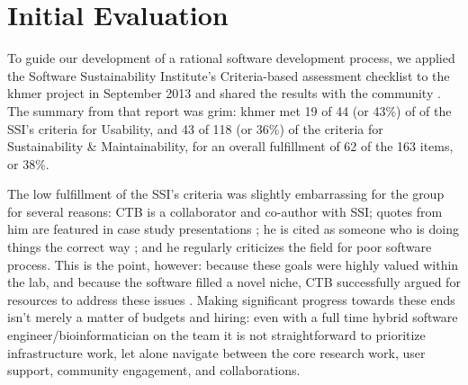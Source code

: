 \documentclass[12pt]{article}
\begin{document}

\section{Initial Evaluation}

To guide our development of a rational software development process,
we applied the Software Sustainability Institute's Criteria-based
assessment checklist \cite{SSI-eval-guide} to the khmer project in
September 2013 and shared the results with the community
\cite{khmer-assessment}. The summary from that report was grim: khmer
met 19 of 44 (or 43\%) of of the SSI's criteria for Usability, and 43
of 118 (or 36\%) of the criteria for Sustainability \& Maintainability, for an 
overall fulfillment of 62 of the 163 items, or 38\%.


The low fulfillment of the SSI's criteria was slightly embarrassing for
the group for several reasons: CTB is a collaborator and co-author
with SSI; quotes from him are featured in case study presentations
\cite{SSI-casestudies}; he is cited as someone who is doing things the
correct way \cite{SSI-recomputation}; and he regularly criticizes the
field for poor software process.  This is the point, however: because
these goals were highly valued within the lab, and because the
software filled a novel niche, CTB successfully argued for resources
to address these issues \cite{khmer-future}.  Making significant
progress towards these ends isn't merely a matter of budgets and
hiring: even with a full time hybrid software
engineer/bioinformatician on the team it is not straightforward to
prioritize infrastructure work, let alone navigate between the core
research work, user support, community engagement, and collaborations.

\end{document}
